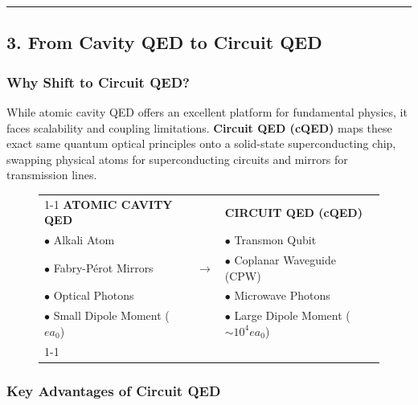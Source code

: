 \documentclass[
]{article}
\begin{document}
\begin{center}\rule{0.5\linewidth}{0.5pt}\end{center}

\subsection{3. From Cavity QED to Circuit
QED}\label{from-cavity-qed-to-circuit-qed}

\subsubsection{Why Shift to Circuit
QED?}\label{why-shift-to-circuit-qed}

While atomic cavity QED offers an excellent platform for fundamental
physics, it faces scalability and coupling limitations. \textbf{Circuit
QED (cQED)} maps these exact same quantum optical principles onto a
solid-state superconducting chip, swapping physical atoms for
superconducting circuits and mirrors for transmission lines.

\begin{figure}[h]
\centering
\renewcommand{\arraystretch}{1.3}
\begin{tabular}{|l|c|l|}
\cline{1-1} \cline{3-3}
\textbf{ATOMIC CAVITY QED} & & \textbf{CIRCUIT QED (cQED)} \\
$\bullet$ Alkali Atom & & $\bullet$ Transmon Qubit \\
$\bullet$ Fabry-Pérot Mirrors & $\longrightarrow$ & $\bullet$ Coplanar Waveguide (CPW) \\
$\bullet$ Optical Photons & & $\bullet$ Microwave Photons \\
$\bullet$ Small Dipole Moment ($ea_0$) & & $\bullet$ Large Dipole Moment ($\sim 10^4 ea_0$) \\
\cline{1-1} \cline{3-3}
\end{tabular}
\end{figure}

\subsubsection{Key Advantages of Circuit
QED}\label{key-advantages-of-circuit-qed}
\end{document}

